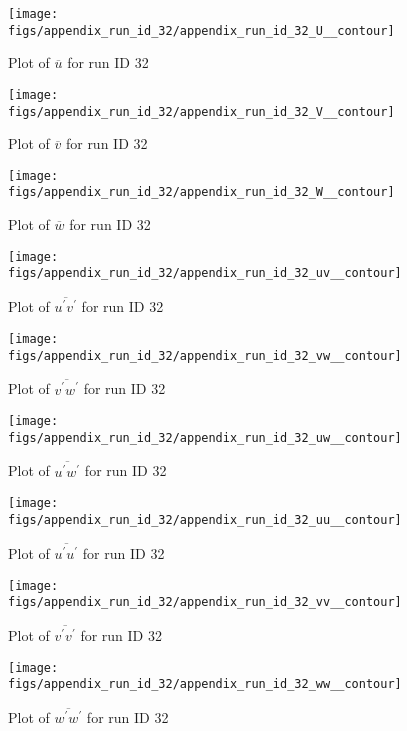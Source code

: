 \begin{figure}[H]
\centering
\texttt{[image: figs/appendix\_run\_id\_32/appendix\_run\_id\_32\_U\_\_contour]}
\caption{Plot of $\overline{u}$ for run ID 32}
\label{fig:appendix_run_id_32_U__contour}
\end{figure}


\begin{figure}[H]
\centering
\texttt{[image: figs/appendix\_run\_id\_32/appendix\_run\_id\_32\_V\_\_contour]}
\caption{Plot of $\overline{v}$ for run ID 32}
\label{fig:appendix_run_id_32_V__contour}
\end{figure}


\begin{figure}[H]
\centering
\texttt{[image: figs/appendix\_run\_id\_32/appendix\_run\_id\_32\_W\_\_contour]}
\caption{Plot of $\overline{w}$ for run ID 32}
\label{fig:appendix_run_id_32_W__contour}
\end{figure}


\begin{figure}[H]
\centering
\texttt{[image: figs/appendix\_run\_id\_32/appendix\_run\_id\_32\_uv\_\_contour]}
\caption{Plot of $\overline{u^\prime v^\prime}$ for run ID 32}
\label{fig:appendix_run_id_32_uv__contour}
\end{figure}


\begin{figure}[H]
\centering
\texttt{[image: figs/appendix\_run\_id\_32/appendix\_run\_id\_32\_vw\_\_contour]}
\caption{Plot of $\overline{v^\prime w^\prime}$ for run ID 32}
\label{fig:appendix_run_id_32_vw__contour}
\end{figure}


\begin{figure}[H]
\centering
\texttt{[image: figs/appendix\_run\_id\_32/appendix\_run\_id\_32\_uw\_\_contour]}
\caption{Plot of $\overline{u^\prime w^\prime}$ for run ID 32}
\label{fig:appendix_run_id_32_uw__contour}
\end{figure}


\begin{figure}[H]
\centering
\texttt{[image: figs/appendix\_run\_id\_32/appendix\_run\_id\_32\_uu\_\_contour]}
\caption{Plot of $\overline{u^\prime u^\prime}$ for run ID 32}
\label{fig:appendix_run_id_32_uu__contour}
\end{figure}


\begin{figure}[H]
\centering
\texttt{[image: figs/appendix\_run\_id\_32/appendix\_run\_id\_32\_vv\_\_contour]}
\caption{Plot of $\overline{v^\prime v^\prime}$ for run ID 32}
\label{fig:appendix_run_id_32_vv__contour}
\end{figure}


\begin{figure}[H]
\centering
\texttt{[image: figs/appendix\_run\_id\_32/appendix\_run\_id\_32\_ww\_\_contour]}
\caption{Plot of $\overline{w^\prime w^\prime}$ for run ID 32}
\label{fig:appendix_run_id_32_ww__contour}
\end{figure}


